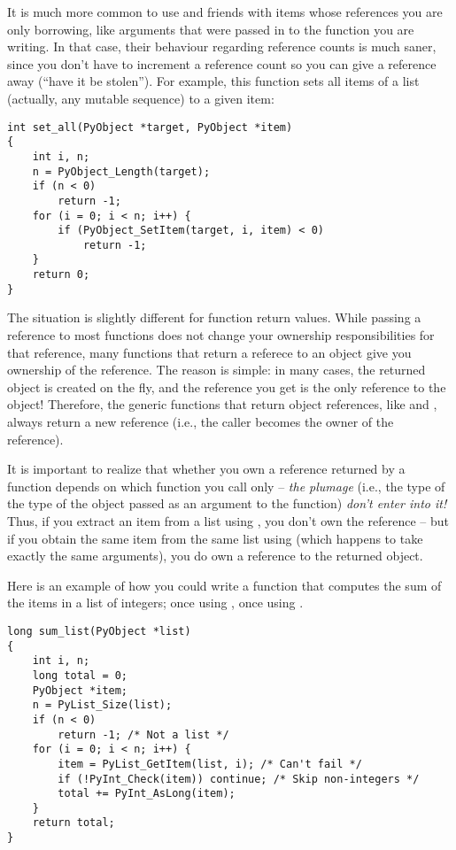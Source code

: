 It is much more common to use  and friends 
with items whose references you are only borrowing, like arguments 
that were passed in to the function you are writing.  In that case, 
their behaviour regarding reference counts is much saner, since you 
don't have to increment a reference count so you can give a reference 
away (``have it be stolen'').  For example, this function sets all 
items of a list (actually, any mutable sequence) to a given item:

\begin{verbatim}
int set_all(PyObject *target, PyObject *item)
{
    int i, n;
    n = PyObject_Length(target);
    if (n < 0)
        return -1;
    for (i = 0; i < n; i++) {
        if (PyObject_SetItem(target, i, item) < 0)
            return -1;
    }
    return 0;
}
\end{verbatim}

The situation is slightly different for function return values.  
While passing a reference to most functions does not change your 
ownership responsibilities for that reference, many functions that 
return a referece to an object give you ownership of the reference.
The reason is simple: in many cases, the returned object is created 
on the fly, and the reference you get is the only reference to the 
object!  Therefore, the generic functions that return object 
references, like  and 
, always return a new reference (i.e., the 
caller becomes the owner of the reference).

It is important to realize that whether you own a reference returned 
by a function depends on which function you call only -- \emph{the 
plumage} (i.e., the type of the type of the object passed as an 
argument to the function) \emph{don't enter into it!}  Thus, if you 
extract an item from a list using , you don't 
own the reference -- but if you obtain the same item from the same 
list using  (which happens to take exactly 
the same arguments), you do own a reference to the returned object.

Here is an example of how you could write a function that computes the 
sum of the items in a list of integers; once using 
, once using .

\begin{verbatim}
long sum_list(PyObject *list)
{
    int i, n;
    long total = 0;
    PyObject *item;
    n = PyList_Size(list);
    if (n < 0)
        return -1; /* Not a list */
    for (i = 0; i < n; i++) {
        item = PyList_GetItem(list, i); /* Can't fail */
        if (!PyInt_Check(item)) continue; /* Skip non-integers */
        total += PyInt_AsLong(item);
    }
    return total;
}
\end{verbatim}

